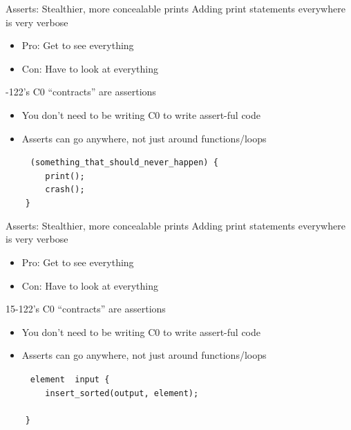 \documentclass[xcolor=dvipsnames]{beamer}
\begin{document}
\begin{frame}{Asserts: Stealthier, more concealable prints}
	Adding print statements everywhere is very verbose
	\begin{itemize}
		\item Pro: Get to see everything
		\item Con: Have to look at everything
	\end{itemize}
	-122's C0 ``contracts'' are assertions
	\begin{itemize}
		\item You don't need to be writing C0 to write assert-ful code
		\item Asserts can go anywhere, not just around functions/loops
	\end{itemize}
	\pause
	\linegap

	\texttt{~~~~~(something\_that\_should\_never\_happen)~\{} \\
	\texttt{~~~~~~~~print();} \\
	\texttt{~~~~~~~~crash();} \\
	\texttt{~~~~\}} \\
\end{frame}
\begin{frame}{Asserts: Stealthier, more concealable prints}
	Adding print statements everywhere is very verbose
	\begin{itemize}
		\item Pro: Get to see everything
		\item Con: Have to look at everything
	\end{itemize}
	15-122's C0 ``contracts'' are assertions
	\begin{itemize}
		\item You don't need to be writing C0 to write assert-ful code
		\item Asserts can go anywhere, not just around functions/loops
	\end{itemize}
	\linegap

		\texttt{~~~~~element~~input~\{} \\
		\texttt{~~~~~~~~insert\_sorted(output,~element);} \\
		\texttt{~~~~~~~~} \\
		\texttt{~~~~\}} \\
\end{frame}
\end{document}
